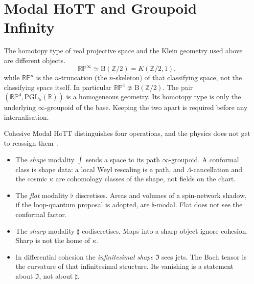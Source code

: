\documentclass{article}
\theoremstyle{definition}
\newcommand{\RP}{\mathbb{RP}}
\newcommand{\R}{\mathbb{R}}
\newcommand{\PGL}{\mathrm{PGL}}
\newcommand{\shape}{\int}
\begin{document}
\section{Modal HoTT and Groupoid Infinity}
\label{sec:modal}

The homotopy type of real projective space and the Klein geometry used above
are different objects.
\[
  \RP^\infty \simeq \mathrm{B}(\mathbb{Z}/2) = K(\mathbb{Z}/2,1),
\]
while \(\RP^n\) is the \(n\)-truncation (the \(n\)-skeleton) of that
classifying space, not the classifying space itself.  In particular
\(\RP^4\not\simeq\mathrm{B}(\mathbb{Z}/2)\).  The pair
\((\RP^4,\PGL_5(\R))\) is a homogeneous geometry.  Its homotopy type is only
the underlying \(\infty\)-groupoid of the base.  Keeping the two apart is
required before any internalisation.

Cohesive Modal HoTT distinguishes four operations, and the physics does not
get to reassign them~\cite{schreibershulman12cohesive}.
\begin{itemize}
  \item The \emph{shape} modality \(\shape\) sends a space to its path
        \(\infty\)-groupoid.  A conformal class is shape data: a local Weyl
        rescaling is a path, and \(\Lambda\)-cancellation and the cosmic
        \(\kappa\) are cohomology classes of the shape, not fields on the
        chart.
  \item The \emph{flat} modality \(\flat\) discretises.  Areas and volumes of
        a spin-network shadow, if the loop-quantum proposal is adopted, are
        \(\flat\)-modal.  Flat does not see the conformal factor.
  \item The \emph{sharp} modality \(\sharp\) codiscretises.  Maps into a sharp
        object ignore cohesion.  Sharp is not the home of \(\kappa\).
  \item In differential cohesion the \emph{infinitesimal shape} \(\Im\) sees
        jets.  The Bach tensor is the curvature of that infinitesimal
        structure.  Its vanishing is a statement about \(\Im\), not about
        \(\sharp\).
\end{itemize}
\end{document}
